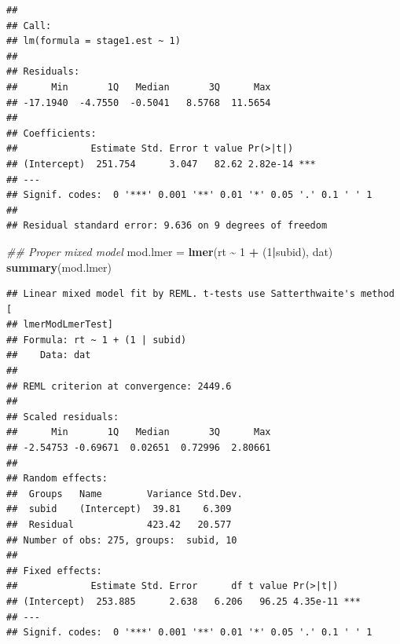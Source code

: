 \documentclass[
]{book}
\newenvironment{Shaded}{\begin{snugshade}}{\end{snugshade}}
\newcommand{\CommentTok}[1]{\textcolor[rgb]{0.56,0.35,0.01}{\textit{#1}}}
\newcommand{\ControlFlowTok}[1]{\textcolor[rgb]{0.13,0.29,0.53}{\textbf{#1}}}
\newcommand{\DecValTok}[1]{\textcolor[rgb]{0.00,0.00,0.81}{#1}}
\newcommand{\KeywordTok}[1]{\textcolor[rgb]{0.13,0.29,0.53}{\textbf{#1}}}
\newcommand{\NormalTok}[1]{#1}
\newcommand{\OperatorTok}[1]{\textcolor[rgb]{0.81,0.36,0.00}{\textbf{#1}}}
\newcommand{\OtherTok}[1]{\textcolor[rgb]{0.56,0.35,0.01}{#1}}
\newcommand{\StringTok}[1]{\textcolor[rgb]{0.31,0.60,0.02}{#1}}
\begin{document}
\begin{Shaded}
\end{Shaded}

\begin{verbatim}
## 
## Call:
## lm(formula = stage1.est ~ 1)
## 
## Residuals:
##      Min       1Q   Median       3Q      Max 
## -17.1940  -4.7550  -0.5041   8.5768  11.5654 
## 
## Coefficients:
##             Estimate Std. Error t value Pr(>|t|)    
## (Intercept)  251.754      3.047   82.62 2.82e-14 ***
## ---
## Signif. codes:  0 '***' 0.001 '**' 0.01 '*' 0.05 '.' 0.1 ' ' 1
## 
## Residual standard error: 9.636 on 9 degrees of freedom
\end{verbatim}

\begin{Shaded}
\begin{Highlighting}[]
\CommentTok{\#\# Proper mixed model}
\NormalTok{mod.lmer =}\StringTok{ }\KeywordTok{lmer}\NormalTok{(rt }\OperatorTok{\textasciitilde{}}\StringTok{ }\DecValTok{1} \OperatorTok{+}\StringTok{ }\NormalTok{(}\DecValTok{1}\OperatorTok{|}\NormalTok{subid), dat)}
\KeywordTok{summary}\NormalTok{(mod.lmer)}
\end{Highlighting}
\end{Shaded}

\begin{verbatim}
## Linear mixed model fit by REML. t-tests use Satterthwaite's method [
## lmerModLmerTest]
## Formula: rt ~ 1 + (1 | subid)
##    Data: dat
## 
## REML criterion at convergence: 2449.6
## 
## Scaled residuals: 
##      Min       1Q   Median       3Q      Max 
## -2.54753 -0.69671  0.02651  0.72996  2.80661 
## 
## Random effects:
##  Groups   Name        Variance Std.Dev.
##  subid    (Intercept)  39.81    6.309  
##  Residual             423.42   20.577  
## Number of obs: 275, groups:  subid, 10
## 
## Fixed effects:
##             Estimate Std. Error      df t value Pr(>|t|)    
## (Intercept)  253.885      2.638   6.206   96.25 4.35e-11 ***
## ---
## Signif. codes:  0 '***' 0.001 '**' 0.01 '*' 0.05 '.' 0.1 ' ' 1
\end{verbatim}
\end{document}
